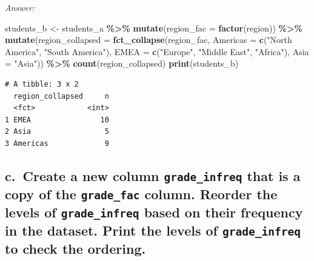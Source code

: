 \documentclass[
]{book}
\newenvironment{Shaded}{\begin{snugshade}}{\end{snugshade}}
\newcommand{\AttributeTok}[1]{\textcolor[rgb]{0.13,0.29,0.53}{#1}}
\newcommand{\FunctionTok}[1]{\textcolor[rgb]{0.13,0.29,0.53}{\textbf{#1}}}
\newcommand{\NormalTok}[1]{#1}
\newcommand{\OtherTok}[1]{\textcolor[rgb]{0.56,0.35,0.01}{#1}}
\newcommand{\SpecialCharTok}[1]{\textcolor[rgb]{0.81,0.36,0.00}{\textbf{#1}}}
\newcommand{\StringTok}[1]{\textcolor[rgb]{0.31,0.60,0.02}{#1}}
\begin{document}
\emph{Answer:}

\begin{Shaded}
\begin{Highlighting}[]
\NormalTok{students\_b }\OtherTok{\textless{}{-}}\NormalTok{ students\_a }\SpecialCharTok{\%\textgreater{}\%}
  \FunctionTok{mutate}\NormalTok{(}\AttributeTok{region\_fac =} \FunctionTok{factor}\NormalTok{(region)) }\SpecialCharTok{\%\textgreater{}\%}
  \FunctionTok{mutate}\NormalTok{(}\AttributeTok{region\_collapsed =} \FunctionTok{fct\_collapse}\NormalTok{(region\_fac, }
                                         \AttributeTok{Americas =} \FunctionTok{c}\NormalTok{(}\StringTok{"North America"}\NormalTok{, }\StringTok{"South America"}\NormalTok{), }
                                         \AttributeTok{EMEA =} \FunctionTok{c}\NormalTok{(}\StringTok{"Europe"}\NormalTok{, }\StringTok{"Middle East"}\NormalTok{, }\StringTok{"Africa"}\NormalTok{), }
                                         \AttributeTok{Asia =} \StringTok{"Asia"}\NormalTok{)) }\SpecialCharTok{\%\textgreater{}\%}
  \FunctionTok{count}\NormalTok{(region\_collapsed)}
\FunctionTok{print}\NormalTok{(students\_b)}
\end{Highlighting}
\end{Shaded}

\begin{verbatim}
# A tibble: 3 x 2
  region_collapsed     n
  <fct>            <int>
1 EMEA                10
2 Asia                 5
3 Americas             9
\end{verbatim}

\hypertarget{c.-create-a-new-column-grade_infreq-that-is-a-copy-of-the-grade_fac-column.-reorder-the-levels-of-grade_infreq-based-on-their-frequency-in-the-dataset.-print-the-levels-of-grade_infreq-to-check-the-ordering.}{%
\subsection{\texorpdfstring{c.~Create a new column \texttt{grade\_infreq} that is a copy of the \texttt{grade\_fac} column. Reorder the levels of \texttt{grade\_infreq} based on their frequency in the dataset. Print the levels of \texttt{grade\_infreq} to check the ordering.}{c.~Create a new column grade\_infreq that is a copy of the grade\_fac column. Reorder the levels of grade\_infreq based on their frequency in the dataset. Print the levels of grade\_infreq to check the ordering.}}\label{c.-create-a-new-column-grade_infreq-that-is-a-copy-of-the-grade_fac-column.-reorder-the-levels-of-grade_infreq-based-on-their-frequency-in-the-dataset.-print-the-levels-of-grade_infreq-to-check-the-ordering.}}
\end{document}
